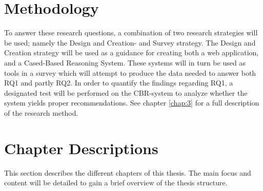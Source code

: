 \section{Methodology}
To answer these research questions, a combination of two research strategies will be used; namely the Design and Creation- and Survey strategy. The Design and Creation strategy will be used as a guidance for creating both a web application, and a Cased-Based Reasoning System. These systems will in turn be used as tools in a survey which will attempt to produce the data needed to answer both RQ1 and partly RQ2. In order to quantify the findings regarding RQ1, a designated test will be performed on the CBR-system to analyze whether the system yields proper recommendations. See chapter \ref{chap:3} for a full description of the research method.

\iffalse
\section{Contributions}

This research's contribution will yield a new computer based artefact; specifically an IS with the goal of both motivating and making it easier for students at NTNU to apply for a study exchange program.

As implied by some of the similar systems and solutions already mentioned, this research will invent a new innovating system that could be extended to other universities. Aside from simplifying this process, the research will contribute by giving new insight and knowledge about what an IS can do to increase the motivation for students to apply for a study exchange program, and if it is possible to completely automate part of this process, as well as providing automated intelligent educated guesses for the most suitable and relevant courses a student should choose. Considering this research objective is primarily designed as a contribution to NTNU, who currently does most of this process manually, if this research and product proves to be successful, it will be a great contribution for NTNU. All though there exists similar systems in other universities which focus on some of the same objectives as this research, commercial-off-the-shelf (COTS) products can not be implemented, when the dependencies and infrastructure is so different for different universities.
\fi

\section{Chapter Descriptions}
This section describes the different chapters of this thesis. The main focus and content will be detailed to gain a brief overview of the thesis structure. 


